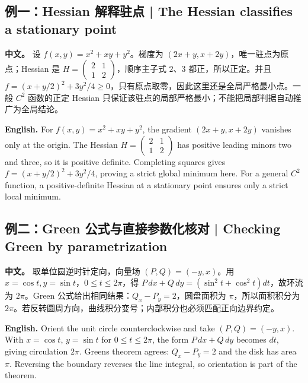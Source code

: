 \documentclass[UTF8,11pt,a4paper]{ctexart}
\newcommand{\APS}[2]{\par\noindent\textbf{中文。} #1\par\noindent\textbf{English.} #2\par\smallskip}
\begin{document}
\subsection*{例一：Hessian 解释驻点 | The Hessian classifies a stationary point}
\APS{设 $f(x,y)=x^2+xy+y^2$。梯度为 $(2x+y,x+2y)$，唯一驻点为原点；Hessian 是 $H=\left(\begin{smallmatrix}2&1\\1&2\end{smallmatrix}\right)$，顺序主子式 $2$、$3$ 都正，所以正定。并且 $f=(x+y/2)^2+3y^2/4\ge0$，只有原点取零，因此这里还是全局严格最小点。一般 $C^2$ 函数的正定 Hessian 只保证该驻点的局部严格最小；不能把局部判据自动推广为全局结论。}{For $f(x,y)=x^2+xy+y^2$, the gradient $(2x+y,x+2y)$ vanishes only at the origin. The Hessian $H=\left(\begin{smallmatrix}2&1\\1&2\end{smallmatrix}\right)$ has positive leading minors two and three, so it is positive definite. Completing squares gives $f=(x+y/2)^2+3y^2/4$, proving a strict global minimum here. For a general $C^2$ function, a positive-definite Hessian at a stationary point ensures only a strict local minimum.}
\subsection*{例二：Green 公式与直接参数化核对 | Checking Green by parametrization}
\APS{取单位圆逆时针定向，向量场 $(P,Q)=(-y,x)$。用 $x=\cos t,y=\sin t$，$0\le t\le2\pi$，得 $P\,dx+Q\,dy=(\sin^2t+\cos^2t)dt$，故环流为 $2\pi$。Green 公式给出相同结果：$Q_x-P_y=2$，圆盘面积为 $\pi$，所以面积积分为 $2\pi$。若反转圆周方向，曲线积分变号；内部积分也必须匹配正向边界约定。}{Orient the unit circle counterclockwise and take $(P,Q)=(-y,x)$. With $x=\cos t$, $y=\sin t$ for $0\le t\le2\pi$, the form $P\,dx+Q\,dy$ becomes $dt$, giving circulation $2\pi$. Green\textquotesingle s theorem agrees: $Q_x-P_y=2$ and the disk has area $\pi$. Reversing the boundary reverses the line integral, so orientation is part of the theorem.}
\end{document}
